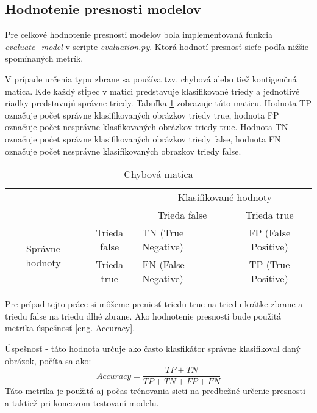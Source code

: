\subsection{Hodnotenie presnosti modelov}
\label{subsec:hodnoteniepresnosti}
Pre celkové hodnotenie presnosti modelov bola implementovaná funkcia \textit{evaluate\_model} v scripte \textit{evaluation.py}.
Ktorá hodnotí presnosť sieťe podľa nižšie spomínaných metrík.

V prípade určenia typu zbrane sa používa tzv. chybová alebo tiež kontigenčná matica.
Kde každý stĺpec v matici predstavuje klasifikované triedy a jednotlivé riadky predstavujú správne triedy.
Tabuľka \ref{tab:chybovamatica} zobrazuje túto maticu.
Hodnota TP označuje počet správne klasifikovaných obrázkov triedy true, hodnota FP označuje počet nesprávne klasfikovaných obrázkov triedy true.
Hodnota TN označuje poćet správne klasifikovaných obrázkov triedy false, hodnota FN označuje počet nesprávne klasifikovaných obrazkov triedy false\cite{odkaz:ChybovaMatica}.
\begin{table}[H]
    \centering
    \label{tab:chybovamatica}
        \begin{tabular}{lllc}
                                                                &                                   & \multicolumn{2}{c}{Klasifikované hodnoty}                                           \\ \cline{3-4} 
                                                                & \multicolumn{1}{l|}{}             & \multicolumn{1}{c|}{Trieda false}        & \multicolumn{1}{c|}{Trieda true}         \\ \cline{2-4} 
        \multicolumn{1}{c|}{\multirow{2}{*}{Správne hodnoty}} & \multicolumn{1}{c|}{Trieda false} & \multicolumn{1}{l|}{TN (True Negative)}  & \multicolumn{1}{c|}{FP (False Positive)} \\ \cline{2-4} 
        \multicolumn{1}{c|}{}                                 & \multicolumn{1}{c|}{Trieda true}  & \multicolumn{1}{l|}{FN (False Negative)} & \multicolumn{1}{c|}{TP (True Positive)}  \\ \cline{2-4} 
    \end{tabular}
    \caption{Chybová matica}
\end{table}
Pre prípad tejto práce si môžeme preniesť triedu true na triedu krátke zbrane a triedu false na triedu dlhé zbrane.
Ako hodnotenie presnosti bude použitá metrika úspešnosť [eng. Accuracy].

Úspešnosť - táto hodnota určuje ako často klasfikátor správne klasifikoval daný obrázok, počíta sa ako:
\begin{equation}
    Accuracy = \frac{TP + TN}{TP + TN + FP + FN}
\end{equation}
Táto metrika je použitá aj počas trénovania sieti na predbežné určenie presnosti a taktiež pri koncovom testovaní modelu.

